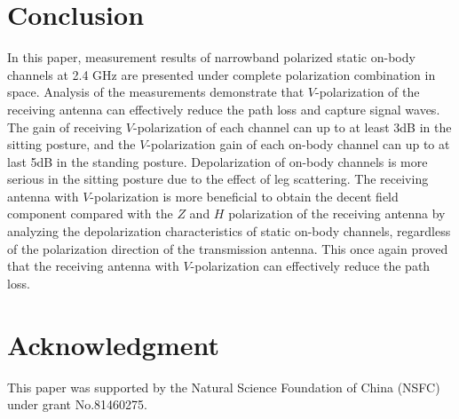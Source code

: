 \documentclass[conference]{IEEEtran}
\begin{document}
\section{Conclusion}\label{sec:conclusion}
In this paper, measurement results of narrowband polarized static on-body channels at 2.4 GHz are presented under complete polarization combination in space. Analysis of the measurements demonstrate that $V$-polarization of the receiving antenna can effectively reduce the path loss and capture signal waves. The gain of receiving $V$-polarization of each channel can up to at least 3dB in the sitting posture, and the $V$-polarization gain of each on-body channel can up to at last 5dB in the standing posture. Depolarization of on-body channels is more serious in the sitting posture due to the effect of leg scattering. The receiving antenna with $V$-polarization is more beneficial to  obtain the decent field component compared with the $Z$ and $H$ polarization of the receiving antenna by analyzing the depolarization characteristics of static on-body channels, regardless of the polarization direction of the transmission antenna. This once again proved that the receiving antenna with $V$-polarization can effectively reduce the path loss.

\section*{Acknowledgment}
This paper was supported by the Natural Science Foundation of China (NSFC) under grant No.81460275.
\end{document}
